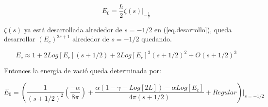 \begin{equation}
    E _0 = \frac{\hbar}{2}  
    \zeta (s)  |  _{- \frac{1}{2}}
\end{equation}

$\zeta (s)$ ya está desarrollada alrededor de $s=-1/2$ en (\ref{eq.desarrollo}), queda desarrollar $(E_c) ^{2s+1} $ alrededor de $s=-1/2$ quedando.

\begin{equation}
    E _c \approx 
    1 + 2 Log[E_c] (s + 1/2) +
    2 Log[E_c] ^2 (s+1/2) ^2 + 
    O (s+1/2)^3
\end{equation}

Entonces la energía de vació queda determinada por:

\begin{equation}
    E _0 =
    \left(
    \frac{1}{(s+1/2)^2} 
    \left(
    \frac{- \alpha}{8 \pi}
    \right)+
    \frac{
    \alpha(1 -\gamma-Log[2L]) - 
    \alpha Log[E_c] 
    }{4 \pi (s+1/2)} 
     + Regular
    \right) | _{s=-1/2}
\end{equation}








